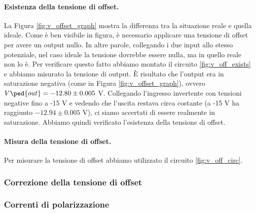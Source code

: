 \paragraph{Esistenza della tensione di offset.}
La Figura \ref{fig:v_offset_graph} mostra la differenza tra la situazione reale e quella
ideale. Come è ben visibile in figura, è necessario applicare una tensione di offset per
avere un output nullo. In altre parole, collegando i due input allo stesso potenziale,
nel caso ideale la tensione dovrebbe essere nulla, ma in quello reale non lo è.
Per verificare questo fatto abbiamo montato il circuito \ref{fig:v_off_exists} e abbiamo misurato
la tensione di output. È risultato che l'output era in saturazione negativa (come in Figura \ref{fig:v_offset_graph}),
ovvero $V\ped{out} = -12.80 \pm 0.005$ V. Collegando l'ingresso invertente con tensioni negative fino a -15 V
e vedendo che l'uscita restava circa costante (a -15 V ha raggiunto $-12.94 \pm 0.005$ V),
ci siamo accertati di essere realmente in saturazione. Abbiamo quindi verificato l'esistenza
della tensione di offset.

\paragraph{Misura della tensione di offset.}
Per misurare la tensione di offset abbiamo utilizzato il circuito \ref{fig:v_off_circ}.

\subsubsection{Correzione della tensione di offset}

\subsubsection{Correnti di polarizzazione}
